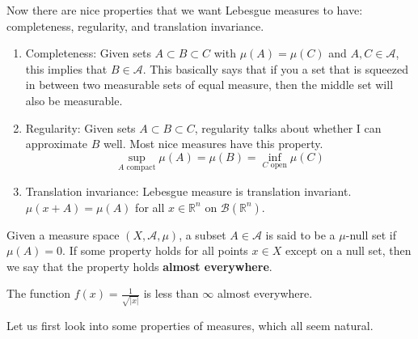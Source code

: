  Now there are nice properties that we want Lebesgue measures to have: completeness, regularity, and translation invariance. 
  \begin{enumerate}
    \item Completeness: Given sets $A \subset B \subset C$ with $\mu(A) = \mu(C)$ and $A, C \in \mathcal{A}$, this implies that $B \in \mathcal{A}$. This basically says that if you a set that is squeezed in between two measurable sets of equal measure, then the middle set will also be measurable. 

    \item Regularity: Given sets $A \subset B \subset C$, regularity talks about whether I can approximate $B$ well. Most nice measures have this property. 
    \begin{equation}
      \sup_{A \text{ compact}} \mu(A) = \mu(B) = \inf_{C \text{ open}} \mu(C)
    \end{equation}

    \item Translation invariance: Lebesgue measure is translation invariant. $\mu(x + A) = \mu(A)$ for all $x \in \mathbb{R}^n$ on $\mathcal{B}(\mathbb{R}^n)$. 
  \end{enumerate}

  \begin{definition}
    Given a measure space $(X, \mathcal{A}, \mu)$, a subset $A \in \mathcal{A}$ is said to be a $\mu$-null set if $\mu(A) = 0$. If some property holds for all points $x \in X$ except on a null set, then we say that the property holds \textbf{almost everywhere}.
  \end{definition}

  \begin{example}
    The function $f(x) = \frac{1}{\sqrt{|x|}}$ is less than $\infty$ almost everywhere. 
  \end{example}

  Let us first look into some properties of measures, which all seem natural. 

